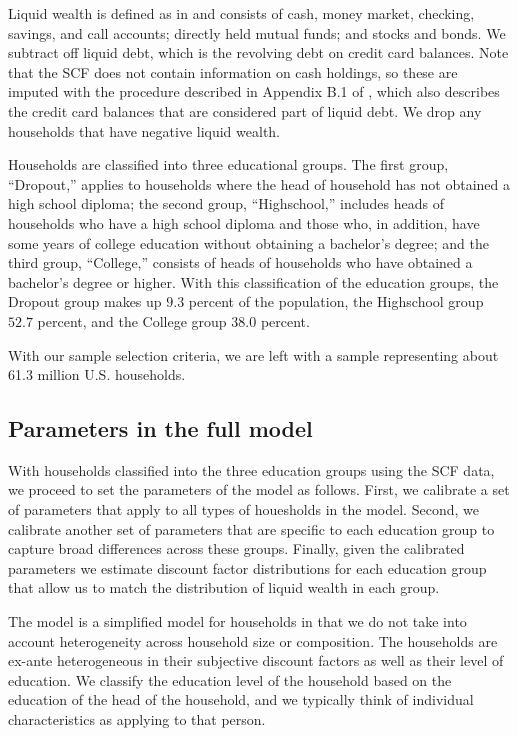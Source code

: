 \documentclass[\econtexRoot/HAFiscal]{subfiles}
\begin{document}
Liquid wealth is defined as in \cite{kaplan2014model} and consists of cash, money market, checking, savings, and call accounts; directly held mutual funds; and stocks and bonds. We subtract off liquid debt, which is the revolving debt on credit card balances. Note that the SCF does not contain information on cash holdings, so these are imputed with the procedure described in Appendix B.1 of \cite{kaplan2014model}, which also describes the credit card balances that are considered part of liquid debt. We drop any households that have negative liquid wealth. 

Households are classified into three educational groups. The first group, ``Dropout,'' applies to households where the head of household has not obtained a high school diploma; the second group, ``Highschool,'' includes heads of households who have a high school diploma and those who, in addition, have some years of college education without obtaining a bachelor's degree; and the third group, ``College,'' consists of heads of households who have obtained a bachelor's degree or higher. With this classification of the education groups, the Dropout group makes up $9.3$ percent of the population, the Highschool group $52.7$ percent, and the College group $38.0$ percent. 

With our sample selection criteria, we are left with a sample representing about 61.3 million U.S. households.

\subsection{Parameters in the full model}
\notinsubfile{\label{sec:paramsFull}}

With households classified into the three education groups using the SCF data, we proceed to set the parameters of the model as follows. First, we calibrate a set of parameters that apply to all types of houesholds in the model. Second, we calibrate another set of parameters that are specific to each education group to capture broad differences across these groups. Finally, given the calibrated parameters we estimate discount factor distributions for each education group that allow us to match the distribution of liquid wealth in each group. 

The model is a simplified model for households in that we do not take into account heterogeneity across household size or composition. The households are ex-ante heterogeneous in their subjective discount factors as well as their level of education. We classify the education level of the household based on the education of the head of the household, and we typically think of individual characteristics as applying to that person. 
\end{document}
